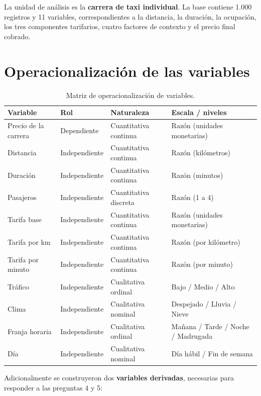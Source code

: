 \documentclass[
]{book}
\begin{document}
La unidad de análisis es la \textbf{carrera de taxi individual}. La base contiene
1.000 registros y 11 variables, correspondientes a
la distancia, la duración, la ocupación, los tres componentes tarifarios, cuatro factores de
contexto y el precio final cobrado.

\section{Operacionalización de las variables}\label{operacionalizaciuxf3n-de-las-variables}

\begin{table}

\caption{\label{tab:tabla-variables}Matriz de operacionalización de variables.}
\centering
\begin{tabular}[t]{l|l|l|l}
\hline
Variable & Rol & Naturaleza & Escala / niveles\\
\hline
Precio de la carrera & Dependiente & Cuantitativa continua & Razón (unidades monetarias)\\
\hline
Distancia & Independiente & Cuantitativa continua & Razón (kilómetros)\\
\hline
Duración & Independiente & Cuantitativa continua & Razón (minutos)\\
\hline
Pasajeros & Independiente & Cuantitativa discreta & Razón (1 a 4)\\
\hline
Tarifa base & Independiente & Cuantitativa continua & Razón (unidades monetarias)\\
\hline
Tarifa por km & Independiente & Cuantitativa continua & Razón (por kilómetro)\\
\hline
Tarifa por minuto & Independiente & Cuantitativa continua & Razón (por minuto)\\
\hline
Tráfico & Independiente & Cualitativa ordinal & Bajo / Medio / Alto\\
\hline
Clima & Independiente & Cualitativa nominal & Despejado / Lluvia / Nieve\\
\hline
Franja horaria & Independiente & Cualitativa ordinal & Mañana / Tarde / Noche / Madrugada\\
\hline
Día & Independiente & Cualitativa nominal & Día hábil / Fin de semana\\
\hline
\end{tabular}
\end{table}

Adicionalmente se construyeron dos \textbf{variables derivadas}, necesarias para responder a las
preguntas 4 y 5:
\end{document}
